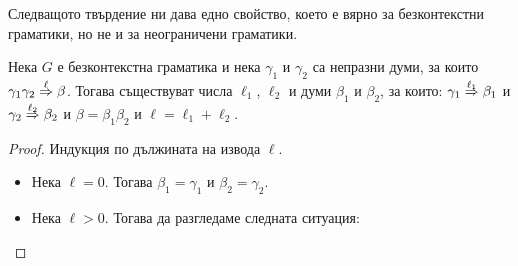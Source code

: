 Следващото твърдение ни дава едно свойство, което е вярно за безконтекстни граматики, но не и за неограничени граматики.
\begin{proposition}\label{pr:grammar:divide-2}
  Нека $G$ е безконтекстна граматика и нека $\gamma_1$ и $\gamma_2$ са непразни думи, за които $\gamma_1\gamma_2 \derive{\ell} \beta$. Тогава
  съществуват числа $\ell_1$, $\ell_2$ и думи $\beta_1$ и $\beta_2$, за които:
  $\gamma_1 \derive{\ell_1} \beta_1$ и $\gamma_2 \derive{\ell_2} \beta_2$ и $\beta = \beta_1\beta_2$ и $\ell = \ell_1 + \ell_2$.
\end{proposition}
\begin{proof}  
Индукция по дължината на извода $\ell$.
\begin{itemize}
\item
  Нека $\ell = 0$. Тогава $\beta_1 = \gamma_1$ и $\beta_2 = \gamma_2$.
\item
  Нека $\ell > 0$. Тогава да разгледаме следната ситуация:
  \begin{prooftree}
  \end{prooftree}


\end{itemize}
\end{proof}
